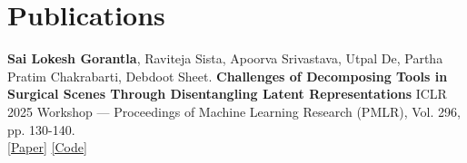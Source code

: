 \documentclass[singlesided,
               paper=a4,
               fontsize=10pt
              ]{my-resume}
\begin{document}
{    \section{Publications}
    \textbf{Sai Lokesh Gorantla}, Raviteja Sista, Apoorva Srivastava, Utpal De, Partha Pratim Chakrabarti, Debdoot Sheet. \textbf{Challenges
    of Decomposing Tools in Surgical Scenes Through Disentangling Latent Representations} ICLR 2025 Workshop — Proceedings
    of Machine Learning Research (PMLR), Vol. 296, pp. 130-140. \\
    \href{https://openreview.net/forum?id=example}{[Paper]} \quad \href{https://github.com/it-is-lokesh}{[Code]}

}
\makebody
\clearpage
\end{document}
